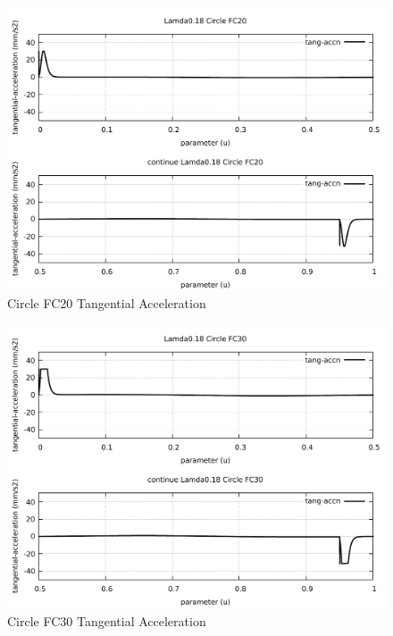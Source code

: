 \begin{figure}
	\caption     {Circle FC20 Tangential Acceleration}
	\label{22-img-Circle-FC20-Tangential-Acceleration.pdf}
	\includegraphics[width=1.00\textwidth]{Chap4/appendix/app-Circle/plots/22-img-Circle-FC20-Tangential-Acceleration.pdf}
\end{figure}

\clearpage
\pagebreak

\begin{figure}
	\caption     {Circle FC30 Tangential Acceleration}
	\label{23-img-Circle-FC30-Tangential-Acceleration.pdf}
	\includegraphics[width=1.00\textwidth]{Chap4/appendix/app-Circle/plots/23-img-Circle-FC30-Tangential-Acceleration.pdf}
\end{figure}


